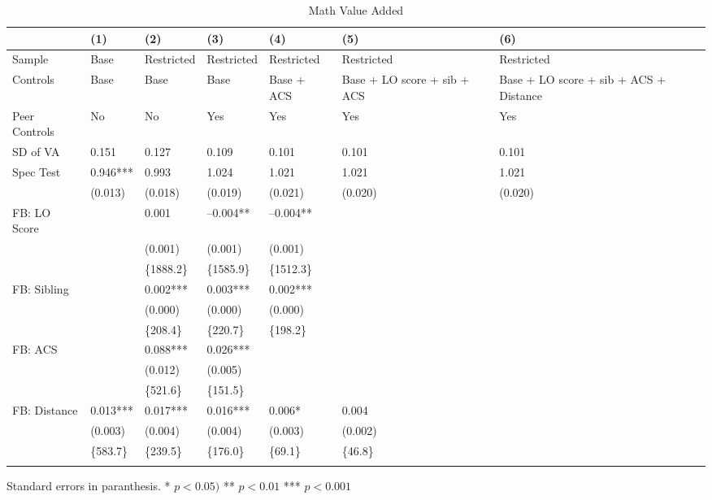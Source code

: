 \begin{table}[tbp] \centering
{}

\caption{Math Value Added}
{\footnotesize
\begin{tabularx}{\linewidth}{lCCCCCC}

\toprule
&{(1)}&{(2)}&{(3)}&{(4)}&{(5)}&{(6)} \tabularnewline
\midrule \addlinespace[\belowrulesep]
Sample&Base&Restricted&Restricted&Restricted&Restricted&Restricted \tabularnewline
Controls&Base&Base&Base&Base + ACS&Base + LO score + sib + ACS&Base + LO score + sib + ACS + Distance \tabularnewline
Peer Controls&No&No&Yes&Yes&Yes&Yes \tabularnewline
\midrule SD of VA&0.151&0.127&0.109&0.101&0.101&0.101 \tabularnewline
Spec Test&0.946***&0.993&1.024&1.021&1.021&1.021 \tabularnewline
&(0.013)&(0.018)&(0.019)&(0.021)&(0.020)&(0.020) \tabularnewline
FB: LO Score&&0.001&--0.004**&--0.004**&& \tabularnewline
&&(0.001)&(0.001)&(0.001)&& \tabularnewline
&&\{1888.2\}&\{1585.9\}&\{1512.3\}&& \tabularnewline
FB: Sibling&&0.002***&0.003***&0.002***&& \tabularnewline
&&(0.000)&(0.000)&(0.000)&& \tabularnewline
&&\{208.4\}&\{220.7\}&\{198.2\}&& \tabularnewline
FB: ACS&&0.088***&0.026***&&& \tabularnewline
&&(0.012)&(0.005)&&& \tabularnewline
&&\{521.6\}&\{151.5\}&&& \tabularnewline
FB: Distance&0.013***&0.017***&0.016***&0.006*&0.004& \tabularnewline
&(0.003)&(0.004)&(0.004)&(0.003)&(0.002)& \tabularnewline
&\{583.7\}&\{239.5\}&\{176.0\}&\{69.1\}&\{46.8\}& \tabularnewline
\bottomrule \addlinespace[\belowrulesep]

\end{tabularx}
\begin{flushleft}
\footnotesize Standard errors in paranthesis. * \(p<0.05)\) ** \(p<0.01\) *** \(p<0.001\)
\end{flushleft}
}
\end{table}
